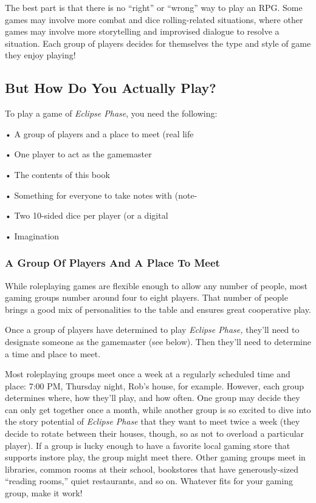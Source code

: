 The best part is that there is no ``right'' or ``wrong'' 
way to play an RPG. Some games may involve more 
combat and dice rolling-related situations, where other 
games may involve more storytelling and improvised 
dialogue to resolve a situation. Each group of players 
decides for themselves the type and style of game they 
enjoy playing!

\subsection{But How Do You Actually Play?}

To play a game of \textit{Eclipse Phase}, you need the following:

•  A group of players and a place to meet (real life 

•  One player to act as the gamemaster

•  The contents of this book

•  Something for everyone to take notes with (note-

•  Two 10-sided dice per player (or a digital 

•  Imagination

\subsubsection{A Group Of Players And A Place To Meet}

While roleplaying games are flexible enough to allow 
any number of people, most gaming groups number 
around four to eight players. That number of people 
brings a good mix of personalities to the table and 
ensures great cooperative play.

Once a group of players have determined to play 
\textit{Eclipse Phase,} they'll need to designate someone as 
the gamemaster (see below). Then they'll need to determine a time and place to meet.

Most roleplaying groups meet once a week at a regularly scheduled time and place: 7:00 PM, Thursday 
night, Rob's house, for example. However, each group 
determines where, how they'll play, and how often. 
One group may decide they can only get together 
once a month, while another group is so excited to 
dive into the story potential of \textit{Eclipse Phase} that 
they want to meet twice a week (they decide to rotate 
between their houses, though, so as not to overload 
a particular player). If a group is lucky enough to 
have a favorite local gaming store that supports instore play, the group might meet there. Other gaming 
groups meet in libraries, common rooms at their 
school, bookstores that have generously-sized ``reading rooms,'' quiet restaurants, and so on. Whatever 
fits for your gaming group, make it work!

